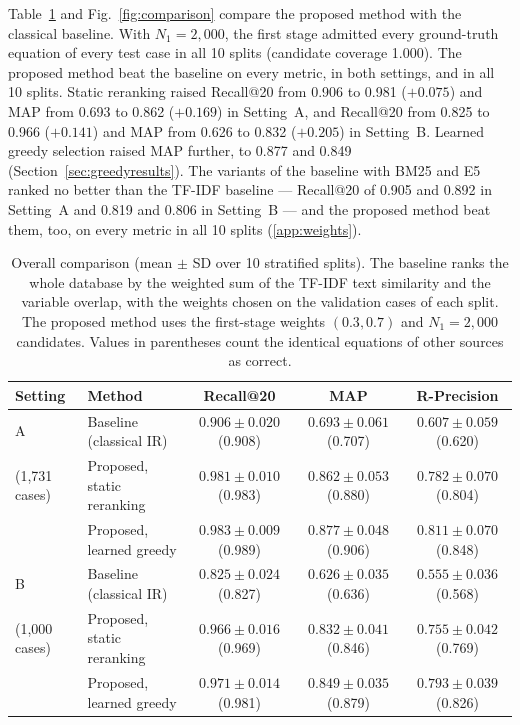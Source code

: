 Table~\ref{tab:overall} and Fig.~\ref{fig:comparison} compare the proposed method with the
classical baseline. With $N_1 = 2{,}000$, the first stage admitted every ground-truth equation of
every test case in all 10 splits (candidate coverage 1.000). The proposed method beat the baseline
on every metric, in both settings, and in all 10 splits. Static reranking raised Recall@20 from
0.906 to 0.981 ($+0.075$) and MAP from 0.693 to 0.862 ($+0.169$) in Setting~A, and Recall@20 from
0.825 to 0.966 ($+0.141$) and MAP from 0.626 to 0.832 ($+0.205$) in Setting~B. Learned greedy
selection raised MAP further, to 0.877 and 0.849 (Section~\ref{sec:greedyresults}). The variants of
the baseline with BM25 and E5 ranked no better than the TF-IDF baseline --- Recall@20 of 0.905 and
0.892 in Setting~A and 0.819 and 0.806 in Setting~B --- and the proposed method beat them, too, on
every metric in all 10 splits (\ref{app:weights}).

\begin{table}[h]\centering
\caption{Overall comparison (mean $\pm$ SD over 10 stratified splits). The baseline ranks the whole
database by the weighted sum of the TF-IDF text similarity and the variable overlap, with the
weights chosen on the validation cases of each split. The proposed method uses the first-stage
weights $(0.3, 0.7)$ and $N_1 = 2{,}000$ candidates. Values in parentheses count the identical
equations of other sources as correct.}
\label{tab:overall}
\footnotesize
\setlength{\tabcolsep}{3pt}
\begin{tabular}{llccc}
\toprule
Setting & Method & Recall@20 & MAP & R-Precision \\
\midrule
A & Baseline (classical IR) & $0.906 \pm 0.020$ (0.908) & $0.693 \pm 0.061$ (0.707) & $0.607 \pm 0.059$ (0.620) \\
(1,731 cases) & Proposed, static reranking & $0.981 \pm 0.010$ (0.983) & $0.862 \pm 0.053$ (0.880) & $0.782 \pm 0.070$ (0.804) \\
 & Proposed, learned greedy & $\mathbf{0.983 \pm 0.009}$ (0.989) & $\mathbf{0.877 \pm 0.048}$ (0.906) & $\mathbf{0.811 \pm 0.070}$ (0.848) \\
\midrule
B & Baseline (classical IR) & $0.825 \pm 0.024$ (0.827) & $0.626 \pm 0.035$ (0.636) & $0.555 \pm 0.036$ (0.568) \\
(1,000 cases) & Proposed, static reranking & $0.966 \pm 0.016$ (0.969) & $0.832 \pm 0.041$ (0.846) & $0.755 \pm 0.042$ (0.769) \\
 & Proposed, learned greedy & $\mathbf{0.971 \pm 0.014}$ (0.981) & $\mathbf{0.849 \pm 0.035}$ (0.879) & $\mathbf{0.793 \pm 0.039}$ (0.826) \\
\bottomrule
\end{tabular}
\end{table}

